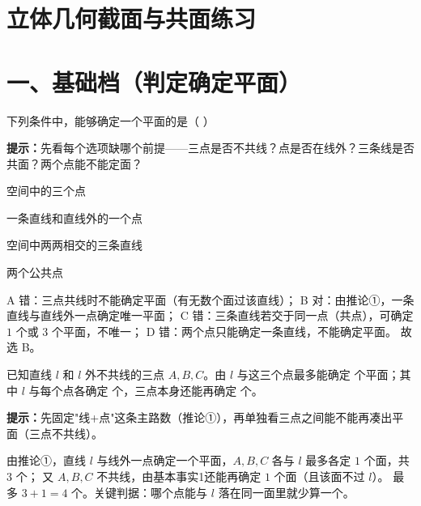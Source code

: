 \documentclass{exam-zh}
\begin{document}
\section*{立体几何截面与共面练习}

\section*{一、基础档（判定确定平面）}


\begin{question}[points=6]
  \noindent
  \begin{minipage}[t]{\dimexpr\linewidth-60mm-6mm\relax}
    \vspace{0pt}
    下列条件中，能够确定一个平面的是（    ）
    \begin{hintbox}
\textbf{提示：}先看每个选项缺哪个前提——三点是否不共线？点是否在线外？三条线是否共面？两个点能不能定面？\end{hintbox}

    \par
    \begin{choices}[columns=1]
      \item 空间中的三个点
      \item 一条直线和直线外的一个点
      \item 空间中两两相交的三条直线
      \item 两个公共点
    \end{choices}
  \end{minipage}\hfill
  \begin{diagramcoltikz}{60mm}{四个选项分别画出示意图，数各自能定几个面。}
  }
  \end{diagramcoltikz}
  \paren[B]
  \begin{solutionblock}
    A 错：三点共线时不能确定平面（有无数个面过该直线）；
B 对：由推论①，一条直线与直线外一点确定唯一平面；
C 错：三条直线若交于同一点（共点），可确定 $1$ 个或 $3$ 个平面，不唯一；
D 错：两个点只能确定一条直线，不能确定平面。
故选 B。
  \end{solutionblock}
\end{question}




\begin{question}[points=6]
  已知直线 $l$ 和 $l$ 外不共线的三点 $A,B,C$。由 $l$ 与这三个点最多能确定 \underline{\quad\quad} 个平面；其中 $l$ 与每个点各确定 \underline{\quad} 个，三点本身还能再确定 \underline{\quad} 个。
  \begin{hintbox}
\textbf{提示：}先固定"线+点"这条主路数（推论①），再单独看三点之间能不能再凑出平面（三点不共线）。\end{hintbox}

  \paren[4；1；1]
  \begin{solutionblock}
    由推论①，直线 $l$ 与线外一点确定一个平面，$A,B,C$ 各与 $l$ 最多各定 $1$ 个面，共 $3$ 个；
又 $A,B,C$ 不共线，由基本事实1还能再确定 $1$ 个面（且该面不过 $l$）。
最多 $3+1=4$ 个。关键判据：哪个点能与 $l$ 落在同一面里就少算一个。
  \end{solutionblock}
\end{question}
\end{document}
